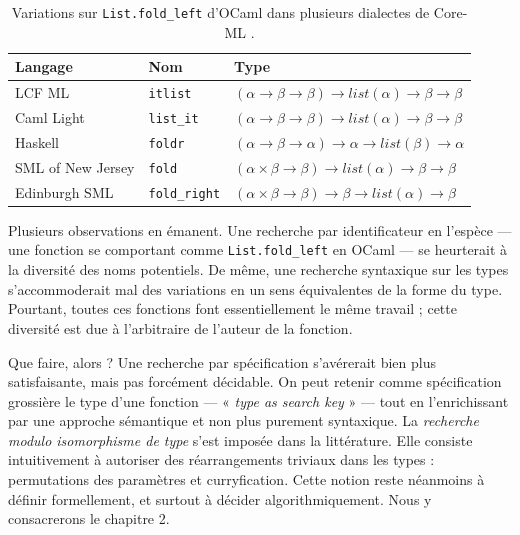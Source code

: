 \documentclass[a4paper]{report}
\theoremstyle{definition}
\begin{document}
\begin{table}[h]
	\centering
	\begin{tabular}{|l|l|l|}
		\hline
			Langage &
			Nom &
			Type
		\\
		\hline
			LCF ML \cite{LCF_ML} &
			\texttt{itlist} &
			$(\alpha \rightarrow \beta \rightarrow \beta) \rightarrow list (\alpha) \rightarrow \beta \rightarrow \beta$
		\\
			Caml Light \cite{Caml_Light} &
			\texttt{list\_it} &
			$(\alpha \rightarrow \beta \rightarrow \beta) \rightarrow list (\alpha) \rightarrow \beta \rightarrow \beta$
		\\
			Haskell \cite{Haskell} &
			\texttt{foldr} &
			$(\alpha \rightarrow \beta \rightarrow \alpha) \rightarrow \alpha \rightarrow list (\beta) \rightarrow \alpha$
		\\
			SML of New Jersey \cite{SML_New_Jersey} &
			\texttt{fold} &
			$(\alpha \times \beta \rightarrow \beta) \rightarrow list (\alpha) \rightarrow \beta \rightarrow \beta$
		\\
			Edinburgh SML \cite{Edinburgh_SML} &
			\texttt{fold\_right} &
			$(\alpha \times \beta \rightarrow \beta) \rightarrow \beta \rightarrow list (\alpha) \rightarrow \beta$
		\\
		\hline
	\end{tabular}
	\caption{\label{tab_fold} Variations sur \texttt{List.fold\_left} d'OCaml dans plusieurs dialectes de Core-ML \cite{Core_ML}.}
\end{table}

Plusieurs observations en émanent. Une recherche par identificateur en l'espèce — une fonction se comportant comme \texttt{List.fold\_left} en OCaml — se heurterait à la diversité des noms potentiels. De même, une recherche syntaxique sur les types s'accommoderait mal des variations en un sens équivalentes de la forme du type. Pourtant, toutes ces fonctions font essentiellement le même travail ; cette diversité est due à l'arbitraire de l'auteur de la fonction.

Que faire, alors ? Une recherche par spécification s'avérerait bien plus satisfaisante, mais pas forcément décidable. On peut retenir comme spécification grossière le type d'une fonction — « \textit{type as search key} » — tout en l'enrichissant par une approche sémantique et non plus purement syntaxique. La \textit{recherche modulo isomorphisme de type} s'est imposée dans la littérature. Elle consiste intuitivement à autoriser des réarrangements triviaux dans les types : permutations des paramètres et curryfication. Cette notion reste néanmoins à définir formellement, et surtout à décider algorithmiquement. Nous y consacrerons le chapitre 2.
\end{document}
